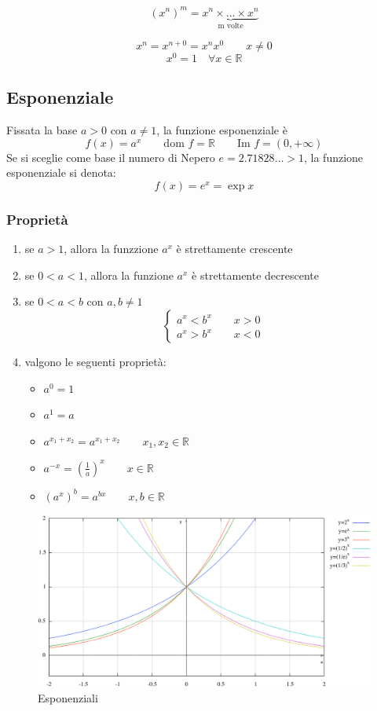 \documentclass[11pt,a4paper,notitlepage]{report}
\let\numberset\mathbb
\newcommand{\R}{\numberset{R}}
\newcommand{\dom}{\text{dom }}
\newcommand{\im}{\text{Im }}
\begin{document}
\[(x^{n})^m= \underbrace{x^n \times \dots \times x^n}_{\text{m volte}}\]

\[x^n=x^{n+0}=x^n x^0 \qquad x\neq 0\]
\[x^0 = 1 \quad \forall x \in \R\]

\subsection{Esponenziale}
Fissata la base $a>0$ con $a \neq 1$, la funzione esponenziale è
\[f(x)=a^x \qquad \dom f = \R \qquad \im f = (0,+\infty)\]
Se si sceglie come base il numero di Nepero $e=2.71828\dots > 1$, la funzione esponenziale si denota:
\[f(x)=e^x=\exp x\]

\subsubsection{Proprietà}
\begin{enumerate}
	\item se $a>1$, allora la funzzione $a^x$ è strettamente crescente
	\item se $0<a<1$, allora la funzione $a^x$ è strettamente decrescente
	\item se $0<a<b$ con $a,b \neq 1$
	\[\begin{cases}
		a^x<b^x \qquad x>0 \\
		a^x > b^x \qquad x<0
	\end{cases}\]
	\item valgono le seguenti proprietà:
	\begin{itemize}
	\item $a^0=1$
	\item $a^1=a$
	\item $a^{x_1+x_2}=a^{x_1+x_2} \qquad x_1,x_2 \in \R$
	\item $a^{-x}=(\frac{1}{a})^x \qquad x \in \R$
	\item $(a^x)^b = a^{bx} \qquad x,b \in \R$
	\end{itemize}
\end{enumerate}

\begin{figure}[H]
  \centering
    \includegraphics[width=1\textwidth]{images/esponenziali.png}
  \caption{Esponenziali}
\end{figure}
\end{document}
